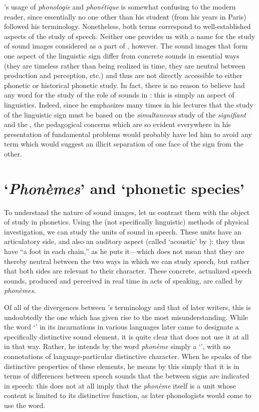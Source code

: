 {\Saussure}'s usage of \emph{phonologie} and \emph{phonétique} is
somewhat confusing to the modern reader, since essentially no one
other than his student  (from his years in Paris) followed
his terminology. Nonetheless, both terms correspond to
well-established aspects of the study of speech. Neither one provides
us with a name for the study of sound images considered as a part of
\emph{}, however. The sound images that form one aspect of the
linguistic sign differ from concrete sounds in essential ways (they
are timeless rather than being realized in time, they are neutral
between production and perception, etc.) and thus are not directly
accessible to either phonetic or historical phonetic study. In fact,
there is no reason to believe {\Saussure} had any word for the study of
the role of sounds in \emph{}: this is simply an aspect of
linguistics. Indeed, since he emphasizes many times in his lectures
that the study of the linguistic sign must be based on the
\emph{simultaneous} study of the \emph{signifiant} and the
\emph{}, the pedagogical concerns which are so evident
everywhere in his presentation of fundamental problems would probably
have led him to avoid any term which would suggest an illicit
separation of one face of the sign from the other.

\section{`\textit{Phonèmes}' and `phonetic species'}

To understand the nature of sound images, let us {contrast} them with
the object of study in phonetics. Using the (not specifically
linguistic) methods of physical investigation, we can study the units
of sound in speech. These units have an articulatory side, and also an
auditory aspect (called `acoustic' by {\Saussure}): they thus have ``a
foot in each chain,'' as he puts it—which does not mean that they are
thereby neutral between the two ways in which we can study speech, but
rather that both sides are relevant to their character. These
concrete, actualized speech sounds, produced and perceived in real
time in acts of speaking, are called by {\Saussure} \emph{phonèmes}.

Of all of the divergences between {\Saussure}'s terminology and that of
later writers, this is undoubtedly the one which has given rise to the
most misunderstanding. While the word `' in its incarnations in
various languages later came to designate a specifically distinctive
sound element, it is quite clear that {\Saussure} does not use it at all
in that way. Rather, he intends by the word \emph{phonème} simply a
`', with no connotations of language-particular
distinctive character. When he speaks of the distinctive properties of
these elements, he means by this simply that it is in terms of
differences between speech sounds that the  between signs
are indicated in speech: this does not at all imply that the
\emph{phonème} itself is a unit whose content is limited to its
distinctive function, as later phonologists would come to use the
word.

